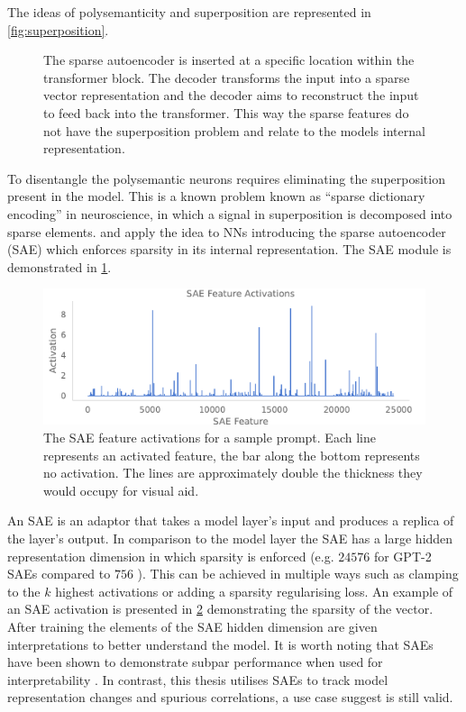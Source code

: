 The ideas of polysemanticity and superposition are represented in \cref{fig:superposition}.

\begin{figure}
    \centering
    \captionsetup{width=.9\textwidth}
    
    \caption{The sparse autoencoder is inserted at a specific location within the transformer block. The decoder transforms the input into a sparse vector representation and the decoder aims to reconstruct the input to feed back into the transformer. This way the sparse features do not have the superposition problem and relate to the models internal representation.}
    \label{fig:sae}
\end{figure}

To disentangle the polysemantic neurons requires eliminating the superposition present in the model.
This is a known problem known as ``sparse dictionary encoding'' \citep{sparse-coding} in neuroscience, in which a signal in superposition is decomposed into sparse elements.
\citet{sae-orig} and \citet{saes} apply the idea to NNs introducing the sparse autoencoder (SAE) which enforces sparsity in its internal representation.
The SAE module is demonstrated in \cref{fig:sae}.

\begin{figure}
    \centering
    \captionsetup{width=.9\textwidth}
    \includegraphics[width=\textwidth]{figures/sae_acts.pdf}
    \caption{
        The SAE feature activations for a sample prompt. Each line represents an activated feature, the bar along the bottom represents no activation.
        The lines are approximately double the thickness they would occupy for visual aid.
    }
    \label{fig:sae-acts}
\end{figure}

An SAE is an adaptor that takes a model layer's input and produces a replica of the layer's output.
In comparison to the model layer the SAE has a large hidden representation dimension in which sparsity is enforced (e.g. $24576$ for GPT-2 SAEs compared to $756$ \citep{saelens}).
This can be achieved in multiple ways such as clamping to the $k$ highest activations \citep{k-sparsity} or adding a sparsity regularising loss.
An example of an SAE activation is presented in \cref{fig:sae-acts} demonstrating the sparsity of the vector.
After training the elements of the SAE hidden dimension are given interpretations to better understand the model.
It is worth noting that SAEs have been shown to demonstrate subpar performance when used for interpretability \citep{saes-bad}.
In contrast, this thesis utilises SAEs to track model representation changes and spurious correlations, a use case \citet{saes-bad} suggest is still valid.

